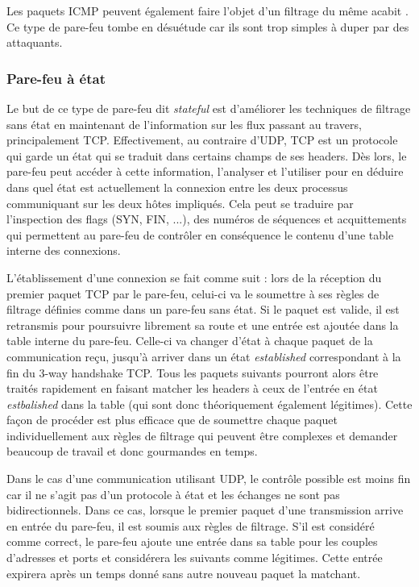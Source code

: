 \documentclass[]{article}
\begin{document}
Les paquets ICMP peuvent également faire l'objet d'un filtrage du même acabit \cite{Shimonski2013}.
Ce type de pare-feu tombe en désuétude car ils sont trop simples à duper par des attaquants.  

\subsubsection{Pare-feu à état}

Le but de ce type de pare-feu dit \textit{stateful} est d'améliorer les techniques de filtrage sans état en maintenant de l'information sur les flux passant au travers, principalement TCP. Effectivement, au contraire d'UDP, TCP est un protocole qui garde un état qui se traduit dans certains champs de ses headers. Dès lors, le pare-feu peut accéder à cette information, l'analyser et l'utiliser pour en déduire dans quel état est actuellement la connexion entre les deux processus communiquant sur les deux hôtes impliqués. Cela peut se traduire par l'inspection des flags (SYN, FIN, ...), des numéros de séquences et acquittements qui permettent au pare-feu de contrôler en conséquence le contenu d'une table interne des connexions.\\ 

\newpage

\par L'établissement d'une connexion se fait comme suit : lors de la réception du premier paquet TCP par le pare-feu, celui-ci va le soumettre à ses règles de filtrage définies comme dans un pare-feu sans état. Si le paquet est valide, il est retransmis pour poursuivre librement sa route et une entrée est ajoutée dans la table interne du pare-feu. Celle-ci va changer d'état à chaque paquet de la communication reçu, jusqu'à arriver dans un état \textit{established} correspondant à la fin du 3-way handshake TCP. Tous les paquets suivants pourront alors être traités rapidement en faisant matcher les headers à ceux de l'entrée en état \textit{estbalished} dans la table (qui sont donc théoriquement également légitimes). Cette façon de procéder est plus efficace que de soumettre chaque paquet individuellement aux règles de filtrage qui peuvent être complexes et demander beaucoup de travail et donc gourmandes en temps.\\

\par Dans le cas d'une communication utilisant UDP, le contrôle possible est moins fin car il ne s'agit pas d'un protocole à état et les échanges ne sont pas bidirectionnels. Dans ce cas, lorsque le premier paquet d'une transmission arrive en entrée du pare-feu, il est soumis aux règles de filtrage. S'il est considéré comme correct, le pare-feu ajoute une entrée dans sa table pour les couples d'adresses et ports et considérera les suivants comme légitimes. Cette entrée expirera après un temps donné sans autre nouveau paquet la matchant. 
\end{document}
